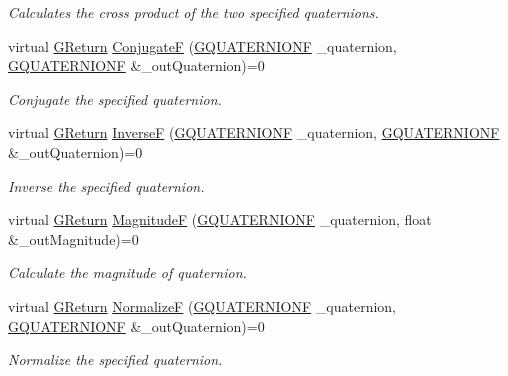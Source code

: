 \begin{DoxyCompactItemize}
\begin{DoxyCompactList}\small\item\em Calculates the cross product of the two specified quaternions. \end{DoxyCompactList}\item 
virtual \hyperlink{namespaceGW_a67a839e3df7ea8a5c5686613a7a3de21}{G\+Return} \hyperlink{classGW_1_1MATH_1_1GQuaternion_adc0da83f5c6011f45195ae98a3f1fa8d}{ConjugateF} (\hyperlink{structGW_1_1MATH_1_1GQUATERNIONF}{G\+Q\+U\+A\+T\+E\+R\+N\+I\+O\+NF} \+\_\+quaternion, \hyperlink{structGW_1_1MATH_1_1GQUATERNIONF}{G\+Q\+U\+A\+T\+E\+R\+N\+I\+O\+NF} \&\+\_\+out\+Quaternion)=0
\begin{DoxyCompactList}\small\item\em Conjugate the specified quaternion. \end{DoxyCompactList}\item 
virtual \hyperlink{namespaceGW_a67a839e3df7ea8a5c5686613a7a3de21}{G\+Return} \hyperlink{classGW_1_1MATH_1_1GQuaternion_a0d8a509536ddf1a4840f48f719686b22}{InverseF} (\hyperlink{structGW_1_1MATH_1_1GQUATERNIONF}{G\+Q\+U\+A\+T\+E\+R\+N\+I\+O\+NF} \+\_\+quaternion, \hyperlink{structGW_1_1MATH_1_1GQUATERNIONF}{G\+Q\+U\+A\+T\+E\+R\+N\+I\+O\+NF} \&\+\_\+out\+Quaternion)=0
\begin{DoxyCompactList}\small\item\em Inverse the specified quaternion. \end{DoxyCompactList}\item 
virtual \hyperlink{namespaceGW_a67a839e3df7ea8a5c5686613a7a3de21}{G\+Return} \hyperlink{classGW_1_1MATH_1_1GQuaternion_a47c8b900ab4ab210631f1dfb280c89fd}{MagnitudeF} (\hyperlink{structGW_1_1MATH_1_1GQUATERNIONF}{G\+Q\+U\+A\+T\+E\+R\+N\+I\+O\+NF} \+\_\+quaternion, float \&\+\_\+out\+Magnitude)=0
\begin{DoxyCompactList}\small\item\em Calculate the magnitude of quaternion. \end{DoxyCompactList}\item 
virtual \hyperlink{namespaceGW_a67a839e3df7ea8a5c5686613a7a3de21}{G\+Return} \hyperlink{classGW_1_1MATH_1_1GQuaternion_ac1f96d734beba721fdfbc2e5cfb72cd2}{NormalizeF} (\hyperlink{structGW_1_1MATH_1_1GQUATERNIONF}{G\+Q\+U\+A\+T\+E\+R\+N\+I\+O\+NF} \+\_\+quaternion, \hyperlink{structGW_1_1MATH_1_1GQUATERNIONF}{G\+Q\+U\+A\+T\+E\+R\+N\+I\+O\+NF} \&\+\_\+out\+Quaternion)=0
\begin{DoxyCompactList}\small\item\em Normalize the specified quaternion. \end{DoxyCompactList}\item 

\end{DoxyCompactItemize}

